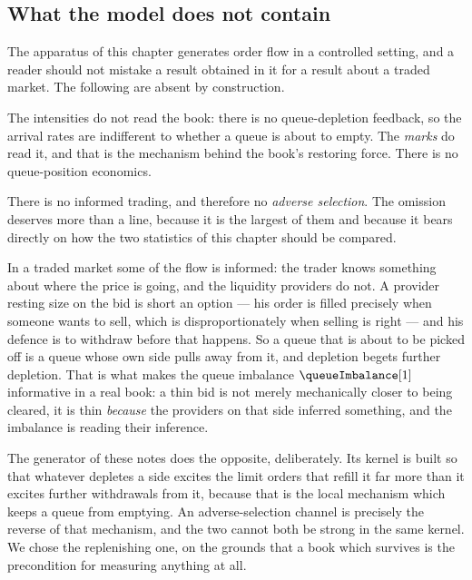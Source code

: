 \subsection{What the model does not contain}

The apparatus of this chapter generates order flow in a controlled setting,
and a reader should not mistake a result obtained in it for a result about a traded market.
The following are absent by construction.

The intensities do not read the book: there is no queue-depletion feedback,
so the arrival rates are indifferent to whether a queue is about to empty.
The \emph{marks} do read it, and that is the mechanism behind the book's restoring force.
There is no queue-position economics.

There is no informed trading, and therefore no \emph{adverse selection}.
The omission deserves more than a line, because it is the largest of them and because it
bears directly on how the two statistics of this chapter should be compared.

In a traded market some of the flow is informed: the trader knows something about where the
price is going, and the liquidity providers do not.
A provider resting size on the bid is short an option --- his order is filled precisely when
someone wants to sell, which is disproportionately when selling is right ---
and his defence is to withdraw before that happens.
So a queue that is about to be picked off is a queue whose own side pulls away from it,
and depletion begets further depletion.
That is what makes the queue imbalance $\queueImbalance[1]$ informative in a real book:
a thin bid is not merely mechanically closer to being cleared,
it is thin \emph{because} the providers on that side inferred something,
and the imbalance is reading their inference.

The generator of these notes does the opposite, deliberately.
Its kernel is built so that whatever depletes a side excites the limit orders that refill it
far more than it excites further withdrawals from it,
because that is the local mechanism which keeps a queue from emptying.
An adverse-selection channel is precisely the reverse of that mechanism,
and the two cannot both be strong in the same kernel.
We chose the replenishing one, on the grounds that a book which survives is the
precondition for measuring anything at all.

